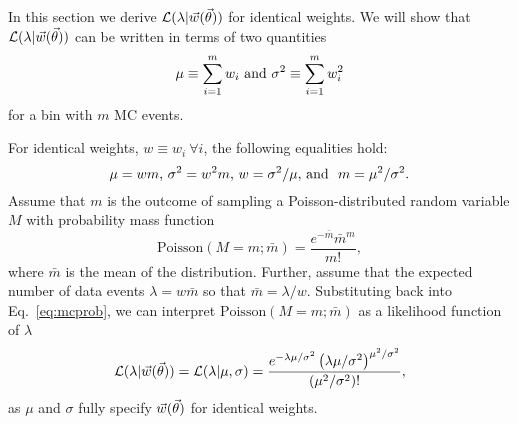 In this section we derive $\mathcal{L}(\lambda|\vec{w}(\vec{\theta}))$ for identical weights. We will show that $\mathcal{L}(\lambda|\vec{w}(\vec{\theta}))$ can be written in terms of two quantities
\begin{equation}\label{eq:musigma}
\mu \equiv \sum_{i=1}^m w_i~\textmd{and}~\sigma^2 \equiv \sum_{i=1}^m w_i^2
\end{equation}
for a bin with $m$ MC events.

For identical weights, $w \equiv w_i~\forall i$, the following equalities hold:
\begin{equation}\label{eq:ids}
\mu=wm \textmd{,}~ \sigma^2=w^2 m \textmd{,}~ w=\sigma^2/\mu \textmd{, and }~ m = \mu^2/\sigma^2.
\end{equation}
Assume that $m$ is the outcome of sampling a Poisson-distributed random variable $M$ with probability mass function
\begin{equation}\label{eq:mcprob}
\mathrm{Poisson}(M=m;\bar m) = \frac{e^{-\bar m} {\bar m}^m}{m!},
\end{equation}
where $\bar m$ is the mean of the distribution. Further, assume that the expected number of data events $\lambda=w \bar m$ so that $\bar m = \lambda/w$. Substituting back into Eq.~\eqref{eq:mcprob}, we can interpret $\mathrm{Poisson}(M=m;\bar m)$ as a likelihood function of $\lambda$
\begin{equation}
\mathcal{L}(\lambda|\vec{w}(\vec{\theta}))=\mathcal{L}(\lambda|\mu, \sigma)=\frac{e^{-\lambda\mu/\sigma^2}\left(\lambda\mu/\sigma^2\right)^{\mu^2/\sigma^2}}{(\mu^2/\sigma^2)!},
\label{eq:poisson_conditional}
\end{equation}
as $\mu$ and $\sigma$ fully specify $\vec{w}(\vec{\theta})$ for identical weights.
